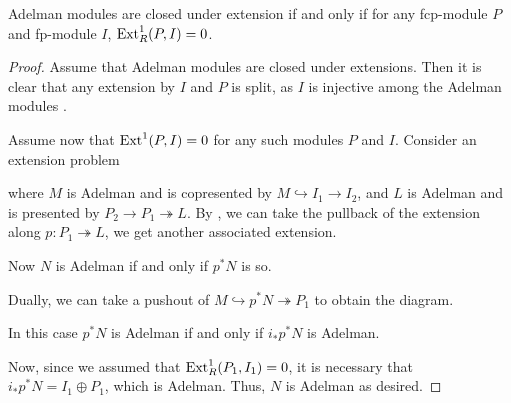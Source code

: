 \begin{proposition}
  \label{adelman-ext-problem-red}
  Adelman modules are closed under extension if and only if for any fcp-module $P$ and fp-module $I$, $\textup{Ext}^1_R(P,I) = 0$.
\end{proposition}

\begin{proof}
  Assume that Adelman modules are closed under extensions.
  Then it is clear that any extension by $I$ and $P$ is split, as $I$ is injective among the Adelman modules .

  Assume now that $\textup{Ext}^1(P,I) = 0$ for any such modules $P$ and $I$.
  Consider an extension problem
  \begin{center}
  \end{center}
  where $M$ is Adelman and is copresented by $M \hookrightarrow I_1 \rightarrow I_2$, and $L$ is Adelman and is presented by $P_2 \rightarrow P_1 \twoheadrightarrow L$.
  By , we can take the pullback of the extension along $p : P_1 \twoheadrightarrow L$, we get another associated extension.
  \begin{center}
  \end{center}
  Now $N$ is Adelman if and only if $p^*N$ is so.

  Dually, we can take a pushout of $M \hookrightarrow p^*N \twoheadrightarrow P_1$  to obtain the diagram.
  \begin{center}
  \end{center}
  In this case $p^*N$ is Adelman if and only if $i_*p^*N$ is Adelman.

  Now, since we assumed that $\textup{Ext}^1_R(P_1,I_1) = 0$, it is necessary that $i_*p^*N = I_1 \oplus P_1$, which is Adelman.
  Thus, $N$ is Adelman as desired.
\end{proof}

